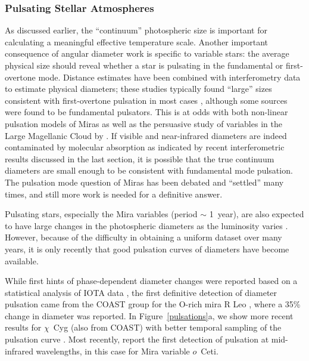 \documentclass[12pt]{article}
\begin{document}
\subsubsection{Pulsating Stellar Atmospheres}

As discussed earlier, the ``continuum'' photospheric size is important
for calculating a meaningful effective temperature scale.  Another
important consequence of angular diameter work is specific to variable
stars: the average physical size should reveal whether a star is
pulsating in the fundamental or first-overtone mode.  Distance
estimates have been combined with interferometry data to
estimate physical diameters; these studies typically found
``large'' sizes consistent with first-overtone pulsation
in most cases \citep[e.g.,][]{hst1995,leeuwen1997,whitelock2000},
although some sources were found to be fundamental pulsators.  This is
at odds with both non-linear pulsation models of Miras
\citep{bessell1996} as well as the persuasive study of variables in
the Large Magellanic Cloud by \citet{wood1996}.  If visible and
near-infrared diameters are indeed contaminated by molecular
absorption as indicated by recent interferometric results discussed in
the last section, it is possible that the true continuum diameters are
small enough to be consistent with fundamental mode pulsation.  The
pulsation mode question of Miras has been debated and ``settled'' many
times, and still more work is needed for a definitive answer.

Pulsating stars, especially the Mira variables (period $\sim$ 1~year),
are also expected to have large changes in the photospheric diameters as
the luminosity varies \citep[e.g.,][]{bessell1989,yaari1996}.
However, because of the difficulty in obtaining a uniform dataset over
many years, it is only recently that good pulsation curves of
diameters have become available.

While first hints of phase-dependent diameter changes were reported
based on a statistical analysis of IOTA data \citep{vanbelle1996}, the
first definitive detection of diameter pulsation came from the COAST
group for the O-rich mira R Leo \citep{burns1998}, where a 35\% change
in diameter was reported.  In Figure~\ref{pulsations}a, we show more
recent results for $\chi$~Cyg (also from COAST) with better temporal
sampling of the pulsation curve \citep{young2000a}.  Most recently,
\citet{weiner2003} report the first detection of pulsation at
mid-infrared wavelengths, in this case for Mira variable $o$~Ceti.
\end{document}
